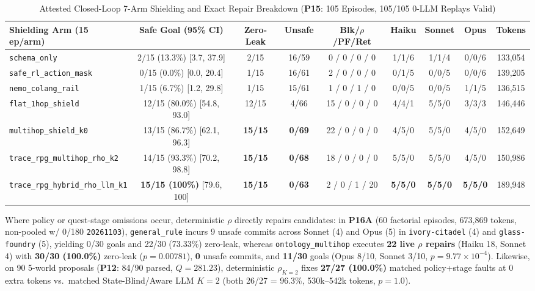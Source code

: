 \begin{table}[!tbp]
\caption{Attested Closed-Loop 7-Arm Shielding and Exact Repair Breakdown (\textbf{P15}: 105 Episodes, 105/105 0-LLM Replays Valid)}
\label{tab:kbs-mas}
\centering
\scriptsize
\setlength{\tabcolsep}{3.2pt}
\begin{tabularx}{\textwidth}{@{}>{\raggedright\arraybackslash}Xcccccccc@{}}
\toprule
\textbf{Shielding Arm (15 ep/arm)} & \textbf{Safe Goal (95\% CI)} & \textbf{Zero-Leak} & \textbf{Unsafe} & \textbf{Blk/$\rho$/PF/Ret} & \textbf{Haiku} & \textbf{Sonnet} & \textbf{Opus} & \textbf{Tokens} \\
\midrule
\texttt{schema\_only} & 2/15 (13.3\%) [3.7, 37.9] & 2/15 & 16/59 & 0 / 0 / 0 / 0 & 1/1/6 & 1/1/4 & 0/0/6 & 133,054 \\
\texttt{safe\_rl\_action\_mask}~\cite{alshiekh2018shield} & 0/15 (0.0\%) [0.0, 20.4] & 1/15 & 16/61 & 2 / 0 / 0 / 0 & 0/1/5 & 0/0/5 & 0/0/6 & 139,205 \\
\texttt{nemo\_colang\_rail}~\cite{rebedea2023nemo} & 1/15 (6.7\%) [1.2, 29.8] & 1/15 & 15/61 & 1 / 0 / 1 / 0 & 0/0/5 & 0/0/5 & 1/1/5 & 136,515 \\
\texttt{flat\_1hop\_shield} & 12/15 (80.0\%) [54.8, 93.0] & 12/15 & 4/66 & 15 / 0 / 0 / 0 & 4/4/1 & 5/5/0 & 3/3/3 & 146,446 \\
\texttt{multihop\_shield\_k0} & 13/15 (86.7\%) [62.1, 96.3] & \textbf{15/15} & \textbf{0/69} & 22 / 0 / 0 / 0 & 4/5/0 & 5/5/0 & 4/5/0 & 152,649 \\
\texttt{trace\_rpg\_multihop\_rho\_k2} & 14/15 (93.3\%) [70.2, 98.8] & \textbf{15/15} & \textbf{0/68} & 18 / 0 / 0 / 0 & 5/5/0 & 5/5/0 & 4/5/0 & 150,986 \\
\texttt{trace\_rpg\_hybrid\_rho\_llm\_k1} & \textbf{15/15 (100\%)} [79.6, 100] & \textbf{15/15} & \textbf{0/63} & 2 / 0 / 1 / 20 & \textbf{5/5/0} & \textbf{5/5/0} & \textbf{5/5/0} & 189,948 \\
\bottomrule
\end{tabularx}
\end{table}

Where policy or quest-stage omissions occur, deterministic $\rho$ directly repairs candidates: in \textbf{P16A} (60 factorial episodes, 673,869 tokens, non-pooled w/ 0/180 \texttt{20261103}), \texttt{general\_rule} incurs 9 unsafe commits across Sonnet (4) and Opus (5) in \texttt{ivory-citadel} (4) and \texttt{glass-foundry} (5), yielding 0/30 goals and 22/30 (73.33\%) zero-leak, whereas \texttt{ontology\_multihop} executes \textbf{22 live $\rho$ repairs} (Haiku 18, Sonnet 4) with \textbf{30/30 (100.0\%)} zero-leak ($p{=}0.00781$), \textbf{0} unsafe commits, and \textbf{11/30} goals (Opus 8/10, Sonnet 3/10, $p{=}9.77{\times}10^{-4}$). Likewise, on 90 5-world proposals (\textbf{P12}: 84/90 parsed, $Q{=}281.23$), deterministic $\rho_{K=2}$ fixes \textbf{27/27 (100.0\%)} matched policy+stage faults at 0 extra tokens vs.\ matched State-Blind/Aware LLM $K{=}2$ (both 26/27 = 96.3\%, 530k--542k tokens, $p{=}1.0$).

